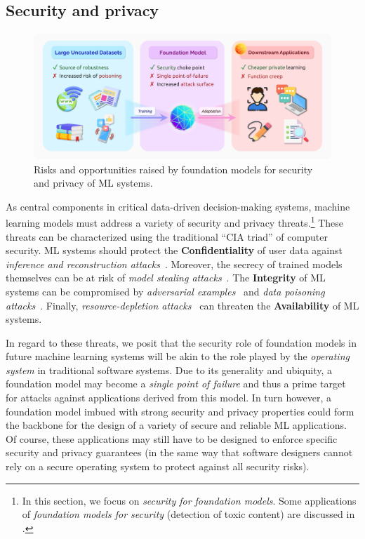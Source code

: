 \newsection
\subsection{Security and privacy}
\label{sec:security}

\begin{figure}[!ht]
\centering
\includegraphics[width=\linewidth]{technology/figures/Security.png}
\caption{\label{fig:security} Risks and opportunities raised by foundation models for security and privacy of ML systems. 
}
\end{figure}

As central components in critical data-driven decision-making systems, machine learning models must address a variety of security and privacy threats.\footnote{In this section, we focus on \emph{security for foundation models}. Some applications of \emph{foundation models for security} (\eg detection of toxic content) are discussed in .} These threats can be characterized using the traditional ``CIA triad'' of computer security. ML systems should protect the \textbf{Confidentiality} of user data against \emph{inference and reconstruction attacks}~\citep{fredrikson2015model,shokri2017membership, carlini2019secret, carlini2020extracting}. Moreover, the secrecy of trained models themselves can be at risk of \emph{model stealing attacks}~\citep{tramer2016stealing, papernot2017blackbox}. The \textbf{Integrity} of ML systems can be compromised by \emph{adversarial examples}~\citep{biggio2013evasion, szegedy2014intriguing} and \emph{data poisoning attacks}~\citep{biggio2012poisoning, chen2017targeted}. Finally, \emph{resource-depletion attacks}~\citep{shumailov2020sponge,hong2020panda} can threaten the \textbf{Availability} of ML systems.

In regard to these threats, we posit that the security role of foundation models in future machine learning systems will be akin to the role played by the \emph{operating system} in traditional software systems. Due to its generality and ubiquity, a foundation model may become a \emph{single point of failure} and thus a prime target for attacks against applications derived from this model.
In turn however, a foundation model imbued with strong security and privacy properties could form the backbone for the design of a variety of secure and reliable ML applications. Of course, these applications may still have to be designed to enforce specific security and privacy guarantees (in the same way that software designers cannot rely on a secure operating system to protect against all security risks).

